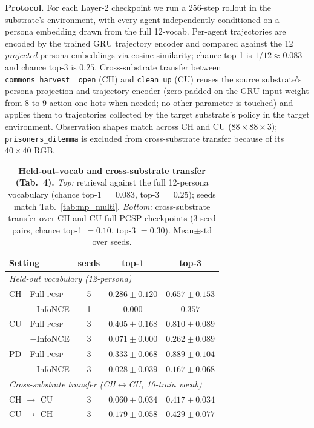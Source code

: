 \documentclass[conference]{IEEEtran}
\newcommand{\PCSP}{\textsc{pcsp}\xspace}
\begin{document}
\noindent\textbf{Protocol.} For each Layer-2 checkpoint we run a $256$-step
rollout in the substrate's environment, with every agent independently
conditioned on a persona embedding drawn from the full 12-vocab. Per-agent
trajectories are encoded by the trained $\text{GRU}$ trajectory encoder and
compared against the 12 \emph{projected} persona embeddings via cosine
similarity; chance top-1 is $1/12\!\approx\!0.083$ and chance top-3 is
$0.25$. Cross-substrate transfer between
\texttt{commons\_harvest\_\_open} (CH) and \texttt{clean\_up} (CU) reuses
the source substrate's persona projection and trajectory encoder
(zero-padded on the GRU input weight from $8$ to $9$ action one-hots when
needed; no other parameter is touched) and applies them to trajectories
collected by the target substrate's policy in the target environment.
Observation shapes match across CH and CU ($88\!\times\!88\!\times\!3$);
\texttt{prisoners\_dilemma} is excluded from cross-substrate transfer
because of its $40\!\times\!40$ RGB.

\begin{table}[t]
  \centering
  \small
  \caption{%
    \textbf{Held-out-vocab and cross-substrate transfer (Tab.~4).}
    \emph{Top:} retrieval against the full 12-persona vocabulary
    (chance top-1 $=0.083$, top-3 $=0.25$); seeds match Tab.~\ref{tab:mp_multi}.
    \emph{Bottom:} cross-substrate transfer over CH and CU full PCSP
    checkpoints (3 seed pairs, chance top-1 $=0.10$, top-3 $=0.30$).
    Mean$\pm$std over seeds.}
  \label{tab:mp_transfer}
  \setlength{\tabcolsep}{4pt}
  \begin{tabular}{l l c c c}
    \toprule
    \multicolumn{2}{l}{Setting} & seeds & top-1 & top-3 \\
    \midrule
    \multicolumn{5}{l}{\emph{Held-out vocabulary (12-persona)}} \\
    CH                & Full \PCSP            & 5 & $0.286\!\pm\!0.120$ & $0.657\!\pm\!0.153$ \\
                      & $-\!$InfoNCE          & 1 & $0.000$            & $0.357$            \\
    CU                & Full \PCSP            & 3 & $\mathbf{0.405\!\pm\!0.168}$ & $\mathbf{0.810\!\pm\!0.089}$ \\
                      & $-\!$InfoNCE          & 3 & $0.071\!\pm\!0.000$ & $0.262\!\pm\!0.089$ \\
    PD                & Full \PCSP            & 3 & $\mathbf{0.333\!\pm\!0.068}$ & $\mathbf{0.889\!\pm\!0.104}$ \\
                      & $-\!$InfoNCE          & 3 & $0.028\!\pm\!0.039$ & $0.167\!\pm\!0.068$ \\
    \midrule
    \multicolumn{5}{l}{\emph{Cross-substrate transfer (CH$\leftrightarrow$CU, 10-train vocab)}} \\
    \multicolumn{2}{l}{CH $\to$ CU}                            & 3 & $0.060\!\pm\!0.034$ & $0.417\!\pm\!0.034$ \\
    \multicolumn{2}{l}{CU $\to$ CH}                            & 3 & $\mathbf{0.179\!\pm\!0.058}$ & $\mathbf{0.429\!\pm\!0.077}$ \\
    \bottomrule
  \end{tabular}
\end{table}
\end{document}
